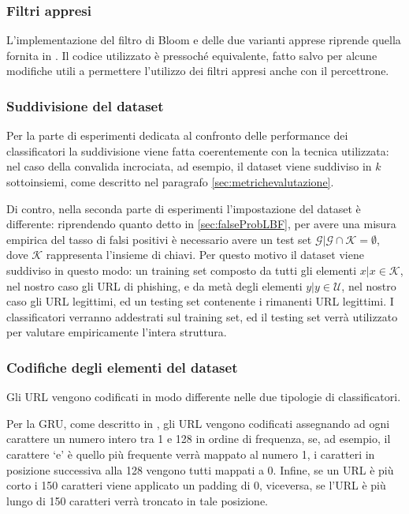 \documentclass[../../main.tex]{subfiles}
\begin{document}
    \subsubsection{Filtri appresi}
    L'implementazione del filtro di Bloom e delle due varianti apprese riprende quella fornita in \cite{ma2020}. Il codice utilizzato è pressoché equivalente, fatto salvo per alcune modifiche utili a permettere l'utilizzo dei filtri appresi anche con il percettrone.

    \subsubsection{Suddivisione del dataset}
    Per la parte di esperimenti dedicata al confronto delle performance dei classificatori la suddivisione viene fatta coerentemente con la tecnica utilizzata: nel caso della convalida incrociata, ad esempio, il dataset viene suddiviso in $k$ sottoinsiemi, come descritto nel paragrafo \ref{sec:metrichevalutazione}.

    Di contro, nella seconda parte di esperimenti l'impostazione del dataset è differente: riprendendo quanto detto in \ref{sec:falseProbLBF}, per avere una misura empirica del tasso di falsi positivi è necessario avere un test set $\mathcal{G} | \mathcal{G} \cap \mathcal{K} = \emptyset$, dove $\mathcal{K}$ rappresenta l'insieme di chiavi. Per questo motivo il dataset viene suddiviso in questo modo: un training set composto da tutti gli elementi $x | x \in \mathcal{K}$, nel nostro caso gli URL di phishing, e da metà degli elementi $y | y \in \mathcal{U}$, nel nostro caso gli URL legittimi, ed un testing set contenente i rimanenti URL legittimi. I classificatori verranno addestrati sul training set, ed il testing set verrà utilizzato per valutare empiricamente l'intera struttura.

    \subsubsection{Codifiche degli elementi del dataset}
    Gli URL vengono codificati in modo differente nelle due tipologie di classificatori.

    Per la GRU, come descritto in \cite{ma2020}, gli URL vengono codificati assegnando ad ogni carattere un numero intero tra 1 e 128 in ordine di frequenza, se, ad esempio, il carattere `e' è quello più frequente verrà mappato al numero 1, i caratteri in posizione successiva alla 128 vengono tutti mappati a 0. Infine, se un URL è più corto i 150 caratteri viene applicato un padding di 0, viceversa, se l'URL è più lungo di 150 caratteri verrà troncato in tale posizione.
\end{document}
